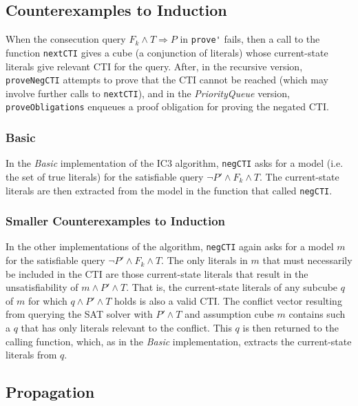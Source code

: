\documentclass[12pt,a4paper,twoside,openright]{report}
\begin{document}
{\begin{lstlisting}
\end{lstlisting}

\subsection{Counterexamples to Induction}

When the consecution query $F_k \wedge T \Rightarrow P$
in \verb,prove', fails, then a call to the function \verb,nextCTI,
gives a cube (a conjunction of literals) whose current-state literals
give relevant CTI for the query. After, in the recursive version,
\verb,proveNegCTI, attempts to prove that the CTI cannot be reached
(which may involve further calls to \verb,nextCTI,), and in
the \emph{PriorityQueue} version, \verb,proveObligations, enqueues
a proof obligation for proving the negated CTI.

\subsubsection{Basic}
In the \emph{Basic} implementation of the IC3 algorithm, \verb,negCTI, asks for a model
(i.e. the set of true literals) for the satisfiable query $\neg P' \wedge F_k \wedge T$.
The current-state literals are then extracted from the model in the function that
called \verb,negCTI,.

\subsubsection{Smaller Counterexamples to Induction}
In the other implementations of the algorithm, \verb,negCTI, again asks for a model $m$
for the satisfiable query $\neg P' \wedge F_k \wedge T$. The only literals in $m$ that
must necessarily be included in the CTI are those current-state literals that result in
the unsatisfiability of $m \wedge P' \wedge T$. That is, the current-state literals of any
subcube $q$ of $m$ for which $q \wedge P' \wedge T$ holds is also a valid CTI.
The conflict vector resulting from querying the SAT solver with $P' \wedge T$ and assumption
cube $m$ contains such a $q$ that has only literals relevant to the conflict. This $q$ is
then returned to the calling function, which, as in the \emph{Basic} implementation, extracts
the current-state literals from $q$.


\subsection{Propagation}

}
\end{document}
